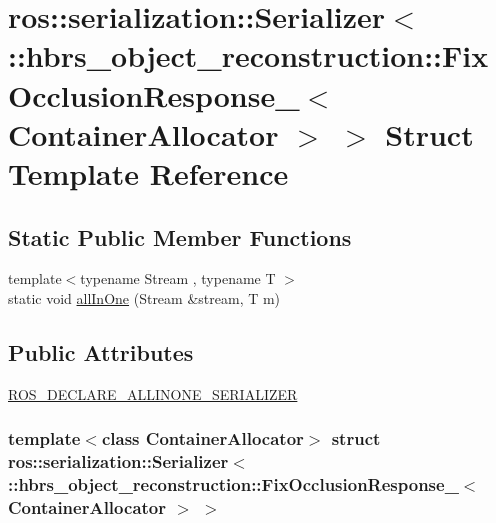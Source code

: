 \hypertarget{structros_1_1serialization_1_1_serializer_3_01_1_1hbrs__object__reconstruction_1_1_fix_occlusion126146a3e1d2d976c77480a5fe9a7e9d}{\section{ros\-:\-:serialization\-:\-:\-Serializer$<$ \-:\-:hbrs\-\_\-object\-\_\-reconstruction\-:\-:\-Fix\-Occlusion\-Response\-\_\-$<$ \-Container\-Allocator $>$ $>$ \-Struct \-Template \-Reference}
\label{structros_1_1serialization_1_1_serializer_3_01_1_1hbrs__object__reconstruction_1_1_fix_occlusion126146a3e1d2d976c77480a5fe9a7e9d}
}
\subsection*{\-Static \-Public \-Member \-Functions}
\begin{DoxyCompactItemize}
\item 
{\footnotesize template$<$typename Stream , typename T $>$ }\\static void \hyperlink{structros_1_1serialization_1_1_serializer_3_01_1_1hbrs__object__reconstruction_1_1_fix_occlusion126146a3e1d2d976c77480a5fe9a7e9d_a5008937f64e07d04c426d685bca324b1}{all\-In\-One} (\-Stream \&stream, \-T m)
\end{DoxyCompactItemize}
\subsection*{\-Public \-Attributes}
\begin{DoxyCompactItemize}
\item 
\hyperlink{structros_1_1serialization_1_1_serializer_3_01_1_1hbrs__object__reconstruction_1_1_fix_occlusion126146a3e1d2d976c77480a5fe9a7e9d_ab6dd4e11ecc1215a326cb102dc707920}{\-R\-O\-S\-\_\-\-D\-E\-C\-L\-A\-R\-E\-\_\-\-A\-L\-L\-I\-N\-O\-N\-E\-\_\-\-S\-E\-R\-I\-A\-L\-I\-Z\-E\-R}
\end{DoxyCompactItemize}
\subsubsection*{template$<$class Container\-Allocator$>$ struct ros\-::serialization\-::\-Serializer$<$ \-::hbrs\-\_\-object\-\_\-reconstruction\-::\-Fix\-Occlusion\-Response\-\_\-$<$ Container\-Allocator $>$ $>$}



